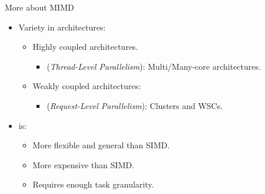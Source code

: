 \begin{frame}[t]{More about MIMD}
\begin{itemize}
  \item Variety in  architectures:
    \begin{itemize}
      \item Highly coupled architectures.
        \begin{itemize}
          \item {} (\emph{Thread-Level Parallelism}): Multi/Many-core architectures.
        \end{itemize}
      \item Weakly coupled architectures:
        \begin{itemize}
          \item {} (\emph{Request-Level Parallelism}): Clusters and WSCs.
        \end{itemize}
    \end{itemize}

  \item {} is:
    \begin{itemize}
      \item More flexible and general than SIMD.
      \item More expensive than SIMD.
      \item Requires enough task granularity.
    \end{itemize}
  
\end{itemize}
\end{frame}

